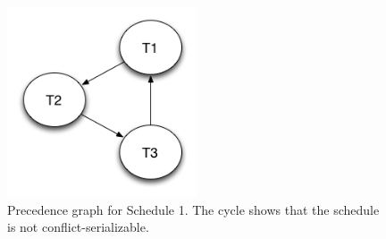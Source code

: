 \begin{figure}[H]
  \centering
  \includegraphics[width=0.5\textwidth]{images/schedule1}
  \caption{Precedence graph for Schedule 1. The cycle shows that the schedule is
  not conflict-serializable.}
  \label{fig:schedule1}
\end{figure}
